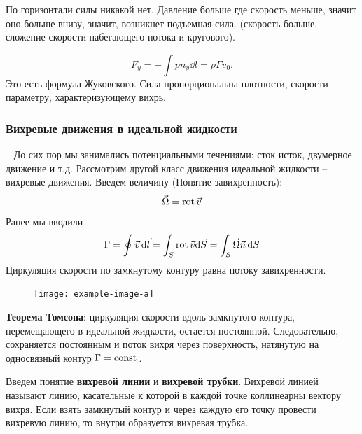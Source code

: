 По горизонтали силы никакой нет. Давление больше где скорость меньше, значит оно больше внизу, значит, возникнет подъемная сила. (скорость больше, сложение скорости набегающего потока и кругового).

\begin{equation}
	F_y=-\int p n_y \dd{l}=\rho \Gamma v_0. 
\end{equation}
Это есть формула Жуковского. Сила пропорциональна плотности, скорости параметру, характеризующему вихрь.

%

 
\subsubsection{Вихревые движения в идеальной жидкости}\
До сих пор мы занимались потенциальными течениями: сток исток, двумерное движение и т.д.
Рассмотрим другой класс движения идеальной жидкости – вихревые движения.
Введем величину (Понятие завихренность):
\begin{equation}
	\vec\Omega=\operatorname{rot} \vec{v}
\end{equation}
Ранее мы вводили 
\begin{equation}
	\Gamma=\oint \vec{v} \,\dd\vec{l}
	=\int_S \operatorname{rot} \vec{v}\dd \vec{S}=\int_S \vec\Omega\vec{n}\,\dd S 
\end{equation}
Циркуляция скорости по замкнутому контуру равна потоку завихренности.

\begin{figure}[h!]
    \centering
    \texttt{[image: example-image-a]}
    \caption{}
    \label{fig:figure1}
\end{figure}

\textbf{Теорема Томсона}: циркуляция скорости вдоль замкнутого контура,
перемещающего в идеальной жидкости, остается постоянной.
Следовательно, сохраняется постоянным и поток вихря через
поверхность, натянутую на односвязный контур $\Gamma=\mathrm{const}\,$.

Введем понятие \textbf{вихревой линии} и \textbf{вихревой трубки}.
Вихревой линией называют линию, касательные к которой в каждой
точке коллинеарны вектору вихря.
Если взять замкнутый контур и через каждую его точку провести
вихревую линию, то внутри образуется вихревая трубка.

